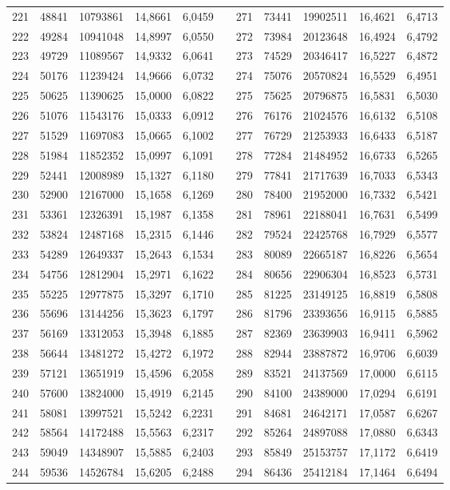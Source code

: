 \begin{longtable}{rrrrrrrrrrr}
221&48841&10793861&14,8661&6,0459&&271&73441&19902511&16,4621&6,4713\\
222&49284&10941048&14,8997&6,0550&&272&73984&20123648&16,4924&6,4792\\
223&49729&11089567&14,9332&6,0641&&273&74529&20346417&16,5227&6,4872\\
224&50176&11239424&14,9666&6,0732&&274&75076&20570824&16,5529&6,4951\\
225&50625&11390625&15,0000&6,0822&&275&75625&20796875&16,5831&6,5030\\
226&51076&11543176&15,0333&6,0912&&276&76176&21024576&16,6132&6,5108\\
227&51529&11697083&15,0665&6,1002&&277&76729&21253933&16,6433&6,5187\\
228&51984&11852352&15,0997&6,1091&&278&77284&21484952&16,6733&6,5265\\
229&52441&12008989&15,1327&6,1180&&279&77841&21717639&16,7033&6,5343\\
230&52900&12167000&15,1658&6,1269&&280&78400&21952000&16,7332&6,5421\\
231&53361&12326391&15,1987&6,1358&&281&78961&22188041&16,7631&6,5499\\
232&53824&12487168&15,2315&6,1446&&282&79524&22425768&16,7929&6,5577\\
233&54289&12649337&15,2643&6,1534&&283&80089&22665187&16,8226&6,5654\\
234&54756&12812904&15,2971&6,1622&&284&80656&22906304&16,8523&6,5731\\
235&55225&12977875&15,3297&6,1710&&285&81225&23149125&16,8819&6,5808\\
236&55696&13144256&15,3623&6,1797&&286&81796&23393656&16,9115&6,5885\\
237&56169&13312053&15,3948&6,1885&&287&82369&23639903&16,9411&6,5962\\
238&56644&13481272&15,4272&6,1972&&288&82944&23887872&16,9706&6,6039\\
239&57121&13651919&15,4596&6,2058&&289&83521&24137569&17,0000&6,6115\\
240&57600&13824000&15,4919&6,2145&&290&84100&24389000&17,0294&6,6191\\
241&58081&13997521&15,5242&6,2231&&291&84681&24642171&17,0587&6,6267\\
242&58564&14172488&15,5563&6,2317&&292&85264&24897088&17,0880&6,6343\\
243&59049&14348907&15,5885&6,2403&&293&85849&25153757&17,1172&6,6419\\
244&59536&14526784&15,6205&6,2488&&294&86436&25412184&17,1464&6,6494\\

\end{longtable}
